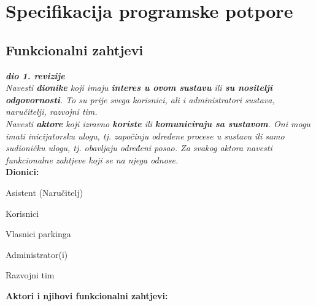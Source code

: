 \chapter{Specifikacija programske potpore}
		
	\section{Funkcionalni zahtjevi}
			
			\textbf{\textit{dio 1. revizije}}\\
			
			\textit{Navesti \textbf{dionike} koji imaju \textbf{interes u ovom sustavu} ili  \textbf{su nositelji odgovornosti}. To su prije svega korisnici, ali i administratori sustava, naručitelji, razvojni tim.}\\
				
			\textit{Navesti \textbf{aktore} koji izravno \textbf{koriste} ili \textbf{komuniciraju sa sustavom}. Oni mogu imati inicijatorsku ulogu, tj. započinju određene procese u sustavu ili samo sudioničku ulogu, tj. obavljaju određeni posao. Za svakog aktora navesti funkcionalne zahtjeve koji se na njega odnose.}\\
			
			
			\noindent \textbf{Dionici:}
			
			\begin{packed_enum}
				
				\item Asistent (Naručitelj)
				\item Korisnici				
				\item Vlasnici parkinga
				\item Administrator(i)
				\item Razvojni tim
				
			\end{packed_enum}
			
			\noindent \textbf{Aktori i njihovi funkcionalni zahtjevi:}
			
